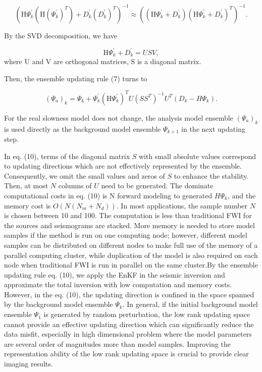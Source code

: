\documentclass[mreferee]{gji}
\begin{document}
\begin{equation}
\left(\mbox{H}\Psi_k^{'}(\mbox{H}(\Psi_k^{'})^T)+D_k^{'}(D_k^{'})^T\right)^{-1}\approx\left((\mbox{H}\Psi_k^{'}+D_k^{'})(\mbox{H}\Psi_k^{'}+D_k^{'})^T\right)^{-1}.
\end{equation}

By the SVD decomposition, we have

\begin{equation}
\mbox{H}\Psi_k^{'}+D_k^{'}=USV,
\end{equation}where U and V are orthogonal matrices, S is a diagonal matrix.

Then, the ensemble updating rule (7) turns to

\begin{equation}
(\Psi_a)_k=\Psi_k+\Psi_k^{'}(\mbox{H}\Psi_k^{'})^TU(SS^T)^{-1}U^T(D_k-H\Psi_k).
\end{equation}

For the real slowness model does not change, the analysis model ensemble $(\Psi_a)_k$ is used directly as the background model ensemble $\Psi_{k+1}$ in the next updating step.

In eq. (10), terms of the diagonal matrix $S$ with small absolute values correspond to updating directions which are not effectively represented by the ensemble. Consequently, we omit the small values and zeros of $S$ to enhance the stability. Then, at most $N$ columns of $U$ need to be generated. The dominate computational costs in eq. (10) is N forward modeling to generated $H\Psi_k$, and the memory cost is $O(N(N_m+N_d))$. In most applications, the sample number $N$ is chosen between 10 and 100. The computation is less than traditional FWI for the sources and seismograms are stacked. More memory is needed to store model samples if the method is run on one computing node; however, different model samples can be distributed on different nodes to make full use of the memory of a parallel computing cluster, while duplication of the model is also required on each node when traditional FWI is run in parallel on the same cluster.By the ensemble updating rule eq. (10), we apply the EnKF in the seismic inversion and approximate the total inversion with low computation and memory costs. However, in the eq. (10), the updating direction is confined in the space spanned by the background model ensemble $\Psi_k$. In general, if the initial background model ensemble $\Psi_1$ is generated by random perturbation, the low rank updating space cannot provide an effective updating direction which can significantly reduce the data misfit, especially in high dimensional problem where the model parameters are several order of magnitudes more than model samples. Improving the representation ability of the low rank updating space is crucial to provide clear imaging results.
\end{document}
